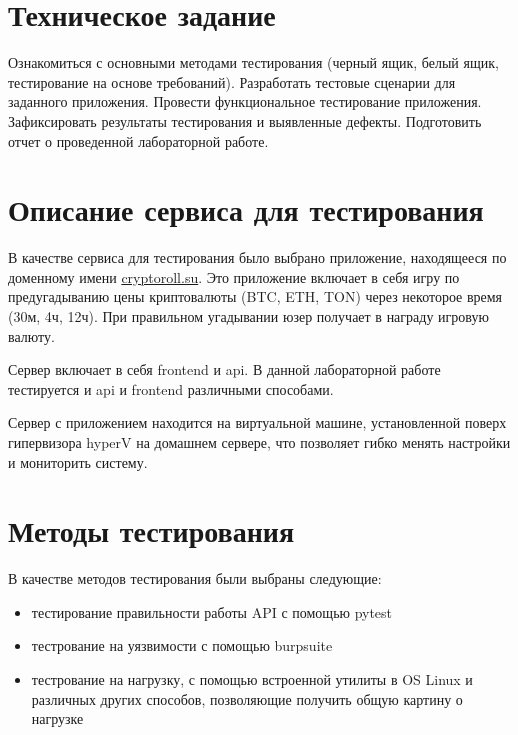 \documentclass[a4paper, 12pt]{article}
\begin{document}
\newpage
\begin{center}
    \tableofcontents
\end{center}





\newpage

\section{Техническое задание}
Ознакомиться с основными методами тестирования (черный ящик, белый ящик, тестирование на основе требований). Разработать тестовые сценарии для заданного приложения. Провести функциональное тестирование приложения. Зафиксировать результаты тестирования и выявленные дефекты. Подготовить отчет о проведенной лабораторной работе.


\section{Описание сервиса для тестирования}
В качестве сервиса для тестирования было выбрано приложение, находящееся по доменному имени \href{https://cryptoroll.su}{cryptoroll.su}. Это приложение включает в себя игру по предугадыванию цены криптовалюты (BTC, ETH, TON) через некоторое время (30м, 4ч, 12ч). При правильном угадывании юзер получает в награду игровую валюту.

Сервер включает в себя frontend и api. В данной лабораторной работе тестируется и api и frontend различными способами.

Сервер с приложением находится на виртуальной машине, установленной поверх гипервизора hyperV на домашнем сервере, что позволяет гибко менять настройки и мониторить систему. 

\section{Методы тестирования}

В качестве методов тестирования были выбраны следующие:
\begin{itemize}
    \item тестирование правильности работы API с помощью pytest
    \item тестрование на уязвимости с помощью burpsuite
    \item тестрование на нагрузку, с помощью встроенной утилиты в OS Linux и различных других способов, позволяющие получить общую картину о нагрузке
\end{itemize}
\end{document}
